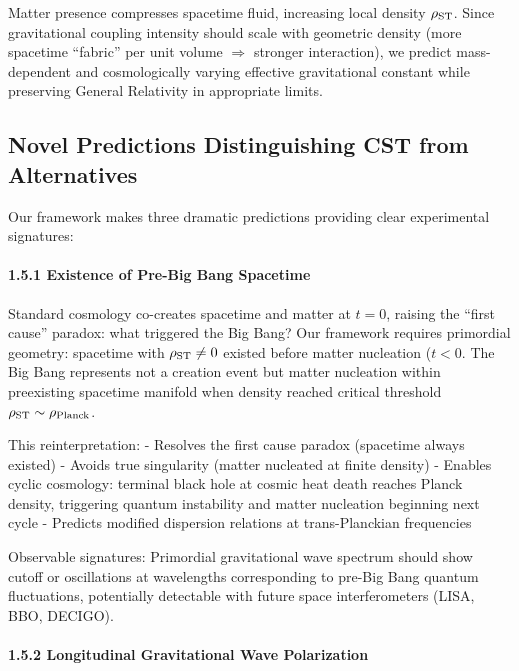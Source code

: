 \documentclass[10pt,a4paper]{article}
\begin{document}
Matter presence compresses spacetime fluid, increasing local density
\(\rho_{\rm ST}\). Since gravitational coupling intensity should scale
with geometric density (more spacetime ``fabric'' per unit volume
\(\Rightarrow\) stronger interaction), we predict mass-dependent and
cosmologically varying effective gravitational constant while preserving
General Relativity in appropriate limits.

\subsection{Novel Predictions Distinguishing CST from
Alternatives}\label{novel-predictions-distinguishing-cst-from-alternatives}

Our framework makes three dramatic predictions providing clear
experimental signatures:

\paragraph{1.5.1 Existence of Pre-Big Bang
Spacetime}\label{existence-of-pre-big-bang-spacetime}

Standard cosmology co-creates spacetime and matter at \(t=0\), raising
the ``first cause'' paradox: what triggered the Big Bang? Our framework
requires primordial geometry: spacetime with \(\rho_{\rm ST} \neq 0\)
existed before matter nucleation (\(t<0\). The Big Bang represents not
a creation event but matter nucleation within preexisting spacetime
manifold when density reached critical threshold
\(\rho_{\rm ST} \sim \rho_{\rm Planck}\).

This reinterpretation: - Resolves the first cause paradox (spacetime
always existed) - Avoids true singularity (matter nucleated at finite
density) - Enables cyclic cosmology: terminal black hole at cosmic heat
death reaches Planck density, triggering quantum instability and matter
nucleation beginning next cycle - Predicts modified dispersion relations
at trans-Planckian frequencies

Observable signatures: Primordial gravitational wave spectrum should
show cutoff or oscillations at wavelengths corresponding to pre-Big Bang
quantum fluctuations, potentially detectable with future space
interferometers (LISA, BBO, DECIGO).

\paragraph{1.5.2 Longitudinal Gravitational Wave
Polarization}\label{longitudinal-gravitational-wave-polarization}
\end{document}
